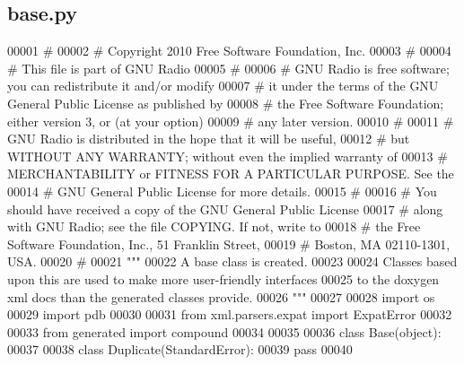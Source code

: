 \subsection{base.\+py}
\label{base_8py_source}

\begin{DoxyCode}
00001 \textcolor{comment}{#}
00002 \textcolor{comment}{# Copyright 2010 Free Software Foundation, Inc.}
00003 \textcolor{comment}{#}
00004 \textcolor{comment}{# This file is part of GNU Radio}
00005 \textcolor{comment}{#}
00006 \textcolor{comment}{# GNU Radio is free software; you can redistribute it and/or modify}
00007 \textcolor{comment}{# it under the terms of the GNU General Public License as published by}
00008 \textcolor{comment}{# the Free Software Foundation; either version 3, or (at your option)}
00009 \textcolor{comment}{# any later version.}
00010 \textcolor{comment}{#}
00011 \textcolor{comment}{# GNU Radio is distributed in the hope that it will be useful,}
00012 \textcolor{comment}{# but WITHOUT ANY WARRANTY; without even the implied warranty of}
00013 \textcolor{comment}{# MERCHANTABILITY or FITNESS FOR A PARTICULAR PURPOSE.  See the}
00014 \textcolor{comment}{# GNU General Public License for more details.}
00015 \textcolor{comment}{#}
00016 \textcolor{comment}{# You should have received a copy of the GNU General Public License}
00017 \textcolor{comment}{# along with GNU Radio; see the file COPYING.  If not, write to}
00018 \textcolor{comment}{# the Free Software Foundation, Inc., 51 Franklin Street,}
00019 \textcolor{comment}{# Boston, MA 02110-1301, USA.}
00020 \textcolor{comment}{#}
00021 \textcolor{stringliteral}{"""}
00022 \textcolor{stringliteral}{A base class is created.}
00023 \textcolor{stringliteral}{}
00024 \textcolor{stringliteral}{Classes based upon this are used to make more user-friendly interfaces}
00025 \textcolor{stringliteral}{to the doxygen xml docs than the generated classes provide.}
00026 \textcolor{stringliteral}{"""}
00027 
00028 \textcolor{keyword}{import} os
00029 \textcolor{keyword}{import} pdb
00030 
00031 \textcolor{keyword}{from} xml.parsers.expat \textcolor{keyword}{import} ExpatError
00032 
00033 \textcolor{keyword}{from} generated \textcolor{keyword}{import} compound
00034 
00035 
00036 \textcolor{keyword}{class }Base(object):
00037 
00038     \textcolor{keyword}{class }Duplicate(StandardError):
00039         \textcolor{keywordflow}{pass}
00040 

\end{DoxyCode}
